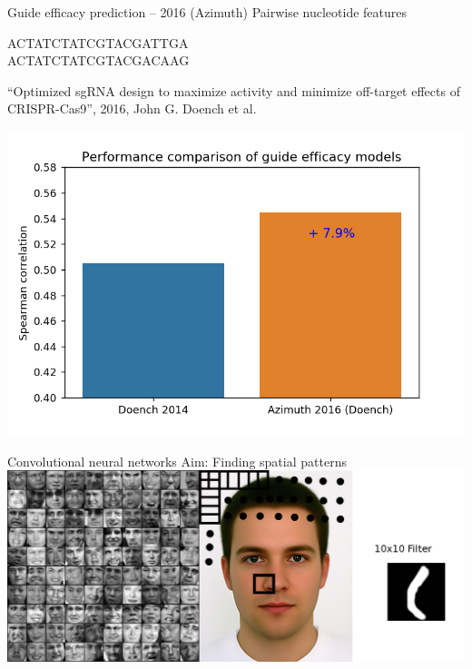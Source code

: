 \documentclass[Nike]{tuberlinbeamer}
\begin{document}
\begin{frame}{Guide efficacy prediction -- 2016 (Azimuth)}
  Pairwise nucleotide features

  \pause
  \huge ACTATCTATCGTACGA{\color{red}TT}GA \\
    \pause
  ACTATCTATCGTACGAC{\color{red}AA}G
    \begin{flushright}
      \tiny
      ``Optimized sgRNA design to maximize activity and minimize off-target effects of CRISPR-Cas9'', 2016, John G. Doench et al.\
    \end{flushright}
    \pause
  \center
  \includegraphics[width=0.5\linewidth]{./model_comparison1.png}
\end{frame}




\begin{frame}{Convolutional neural networks}
  Aim: Finding spatial patterns
  \vspace{0.2cm}
  \pause
  \includegraphics[width=\linewidth]{./nosefilter.png}
\end{frame}
\end{document}
